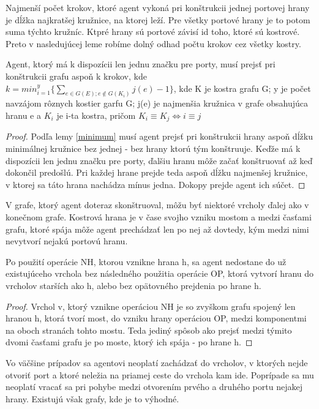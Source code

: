 Najmenší počet krokov, ktoré agent vykoná pri konštrukcii jednej
portovej hrany je dĺžka najkratšej kružnice, na ktorej leží. Pre všetky
portové hrany je to potom suma týchto kružníc. Ktpré hrany sú portové závisí
id toho, ktoré sú kostrové. Preto v nasledujúcej leme robíme dolný odhad
počtu krokov cez všetky kostry.

\begin{lem}
Agent, ktorý má k dispozícii len jednu značku pre porty, 
musí prejsť pri konštrukcii grafu aspoň k krokov, kde 
$k =min_{i=1}^{y}\{\sum_{e \in G(E); e \notin G(K_{i})} j(e)-1  \}$, 
kde K je kostra grafu G; y je počet navzájom rôznych kostier garfu G; j(e) je najmenšia kružnica v
grafe obsahujúca hranu e a $K_{i}$ je i-ta kostra, pričom $K_{i} \equiv K_{j}
\iff i \equiv j$
\end{lem}
\begin{proof}
Podľa lemy \ref{minimum} musí agent prejsť pri konštrukcii hrany aspoň dĺžku
minimálnej kružnice bez jednej - bez hrany ktorú tým konštruuje. Keďže má k
dispozícii len jednu značku pre porty, ďalšiu hranu môže začať konštruovať
až keď dokončil predošlú. Pri každej hrane prejde teda aspoň dĺžku
najmenšej kružnice, v ktorej sa táto hrana nachádza mínus jedna. Dokopy
prejde agent ich súčet.
\end{proof}

V grafe, ktorý agent doteraz skonštruoval, môžu byť niektoré vrcholy ďalej
ako v konečnom grafe. Kostrová hrana je v čase svojho vzniku mostom a medzi
časťami grafu, ktoré spája môže agent prechádzať len po nej až dovtedy, kým
medzi nimi nevytvorí nejakú portovú hranu.

\begin{lem}
Po použití operácie NH, ktorou vznikne hrana h, sa agent nedostane do
už existujúceho vrchola bez následného použitia
operácie OP, ktorá vytvorí hranu do vrcholov starších ako h,
alebo bez opätovného prejdenia po hrane h.
\end{lem}
\begin{proof}
Vrchol v, ktorý vznikne operáciou NH je so zvyškom grafu spojený len hranou
h, ktorá tvorí most, do vzniku hrany operáciou OP, medzi komponentmi na oboch
stranách tohto mostu. Teda jediný spôsob ako prejsť medzi týmito dvomi
časťami grafu je po moste, ktorý ich spája - po hrane h.
\end{proof}

Vo väčšine prípadov sa agentovi neoplatí zachádzať do vrcholov, v ktorých
nejde otvoriť port a ktoré neležia na priamej ceste do vrchola kam ide.
Poprípade sa mu neoplatí vracať sa pri pohybe medzi otvorením prvého a
druhého portu nejakej hrany. Existujú však grafy, kde je to výhodné.

